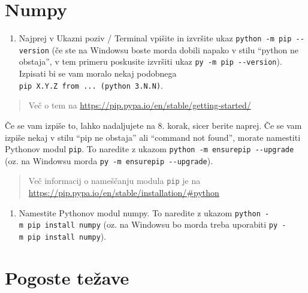 \documentclass[
]{book}
\providecommand{\tightlist}{%
  \setlength{\itemsep}{0pt}\setlength{\parskip}{0pt}}
\begin{document}
\hypertarget{numpy}{%
\section{Numpy}\label{numpy}}

\begin{enumerate}
\def\labelenumi{\arabic{enumi}.}
\setcounter{enumi}{6}
\tightlist
\item
  Najprej v Ukazni poziv / Terminal vpišite in izvršite ukaz \texttt{python\ -m\ pip\ -\/-version}
  (če ste na Windowsu boste morda dobili napako v stilu ``python ne obstaja'',
  v tem primeru poskusite izvršiti ukaz \texttt{py\ -m\ pip\ -\/-version}).
  Izpisati bi se vam moralo nekaj podobnega \texttt{pip\ X.Y.Z\ from\ ...\ (python\ 3.N.N)}.
\end{enumerate}

\begin{quote}
Več o tem na \url{https://pip.pypa.io/en/stable/getting-started/}
\end{quote}

Če se vam izpiše to, lahko nadaljujete na 8. korak, sicer berite naprej.
Če se vam izpiše nekaj v stilu ``pip ne obstaja'' ali ``command not found'',
morate namestiti Pythonov modul \texttt{pip}. To naredite z ukazom
\texttt{python\ -m\ ensurepip\ -\/-upgrade} (oz. na Windowsu morda \texttt{py\ -m\ ensurepip\ -\/-upgrade}).

\begin{quote}
Več informacij o nameščanju modula \texttt{pip} je na \url{https://pip.pypa.io/en/stable/installation/\#python}
\end{quote}

\begin{enumerate}
\def\labelenumi{\arabic{enumi}.}
\setcounter{enumi}{7}
\tightlist
\item
  Namestite Pythonov modul numpy. To naredite z ukazom \texttt{python\ -m\ pip\ install\ numpy}
  (oz. na Windowsu bo morda treba uporabiti \texttt{py\ -m\ pip\ install\ numpy}).
\end{enumerate}

\hypertarget{pogoste-teux17eave}{%
\section{Pogoste težave}\label{pogoste-teux17eave}}
\end{document}
